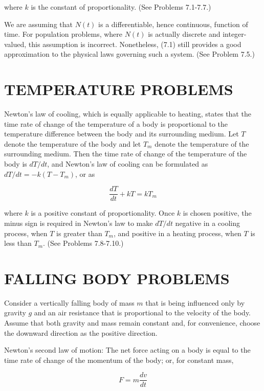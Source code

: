 \documentclass[10pt]{article}
\begin{document}
where $k$ is the constant of proportionality. (See Problems 7.1-7.7.)

We are assuming that $N(t)$ is a differentiable, hence continuous, function of time. For population problems, where $N(t)$ is actually discrete and integer-valued, this assumption is incorrect. Nonetheless, (7.1) still provides a good approximation to the physical laws governing such a system. (See Problem 7.5.)

\section*{TEMPERATURE PROBLEMS}
Newton's law of cooling, which is equally applicable to heating, states that the time rate of change of the temperature of a body is proportional to the temperature difference between the body and its surrounding medium. Let $T$ denote the temperature of the body and let $T_{m}$ denote the temperature of the surrounding medium. Then the time rate of change of the temperature of the body is $d T / d t$, and Newton's law of cooling can be formulated as $d T / d t=-k\left(T-T_{m}\right)$, or as


\begin{equation*}
\frac{d T}{d t}+k T=k T_{m} \tag{7.2}
\end{equation*}


where $k$ is a positive constant of proportionality. Once $k$ is chosen positive, the minus sign is required in Newton's law to make $d T / d t$ negative in a cooling process, when $T$ is greater than $T_{m}$, and positive in a heating process, when $T$ is less than $T_{m}$. (See Problems 7.8-7.10.)

\section*{FALLING BODY PROBLEMS}
Consider a vertically falling body of mass $m$ that is being influenced only by gravity $g$ and an air resistance that is proportional to the velocity of the body. Assume that both gravity and mass remain constant and, for convenience, choose the downward direction as the positive direction.

Newton's second law of motion: The net force acting on a body is equal to the time rate of change of the momentum of the body; or, for constant mass,


\begin{equation*}
F=m \frac{d v}{d t} \tag{7.3}
\end{equation*}
\end{document}
